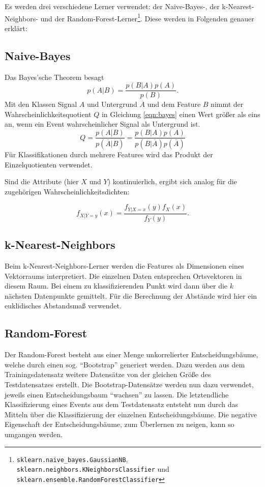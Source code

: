 Es werden drei verschiedene Lerner verwendet: der Naive-Bayes-, der  k-Nearest-Neighbors- und der Random-Forest-Lerner\footnote{\texttt{sklearn.naive\_bayes.GaussianNB},\\ \texttt{sklearn.neighbors.KNeighborsClassifier} und\\ \texttt{sklearn.ensemble.RandomForestClassifier}}. Diese werden in Folgenden genauer erklärt:

\subsection{Naive-Bayes}
Das Bayes'sche Theorem besagt
\begin{equation}
	p(A|B)=\frac{p(B|A)p(A)}{p(B)}.
\end{equation}
Mit den Klassen Signal $A$ und Untergrund $\overline{A}$ und dem Feature $B$ nimmt der Wahrscheinlichkeitsquotient $Q$ in Gleichung \eqref{eqn:bayes} einen Wert größer als
eins an, wenn ein Event wahrscheinlicher Signal als Untergrund ist.
\begin{equation}
	Q=\frac{p(A|B)}{p(\overline{A}|B)} = \frac{p(B|A)p(A)}{p(B|\overline{A})p(\overline{A})}
	\label{eqn:bayes}
\end{equation}
Für Klassifikationen durch mehrere Features wird das Produkt der Einzelquotienten verwendet.

Sind die Attribute (hier $X$ und $Y$) kontinuierlich, ergibt sich analog für die zugehörigen Wahrscheinlichkeitsdichten:

\begin{equation}
	f_{X|Y = y}(x) = \frac{f_{Y|X = x}(y) f_X (x)}{f_Y(y)}.
\end{equation}

\subsection{k-Nearest-Neighbors}
Beim k-Nearest-Neighbors-Lerner  werden die Features als Dimensionen eines Vektorraums interpretiert. Die einzelnen Daten entsprechen Ortsvektoren in diesem Raum. Bei einem zu
klassifizierenden Punkt wird dann über die $k$ nächsten Datenpunkte gemittelt. Für die Berechnung der Abstände wird hier ein euklidisches Abstandsmaß verwendet.


\subsection{Random-Forest}
Der Random-Forest besteht aus einer Menge unkorrelierter Entscheidungsbäume, welche durch einen sog. \enquote{Bootstrap} generiert werden. Dazu werden aus dem Trainingsdatensatz weitere Datensätze von der gleichen Größe des Testdatensatzes erstellt. Die Bootstrap-Datensätze werden nun dazu verwendet, jeweils einen Entscheidungsbaum \enquote{wachsen} zu lassen. Die letztendliche Klassifizierung eines Events aus dem Testdatensatz entsteht nun durch das Mitteln über die Klassifizierung der einzelnen Entscheidungsbäume. Die negative Eigenschaft der Entscheidungsbäume, zum Überlernen zu neigen, kann so umgangen werden.


